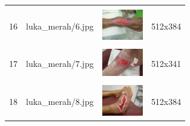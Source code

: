 \begin{table}[H]
\begin{tabular}{|m{0.2in}|m{1.2in}|m{0.7in}|m{0.7in}|}
		& &  &  \\
		16& 
		luka\_merah/6.jpg &
		\includegraphics[width=0.7in]{gambar/dataset_citra/luka_merah/bahan/6.jpg}&
		512x384\\
		\hline
		
		& &  &  \\
		17& 
		luka\_merah/7.jpg &
		\includegraphics[width=0.7in]{gambar/dataset_citra/luka_merah/bahan/7.jpg}&
		512x341\\
		\hline
		
		& &  &  \\
		18& 
		luka\_merah/8.jpg &
		\includegraphics[width=0.7in]{gambar/dataset_citra/luka_merah/bahan/8.jpg}&
		512x384\\
		\hline
		
	\end{tabular}
\end{table}

